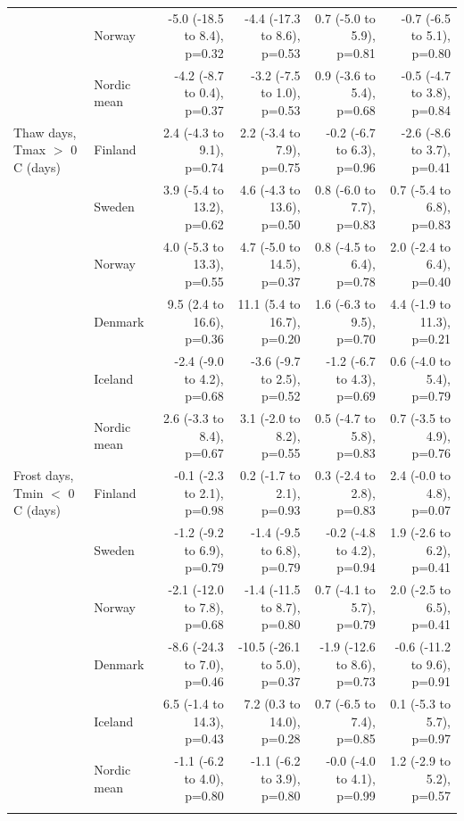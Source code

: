 \begin{tabular}{llrrrr}
 & Norway & -5.0 (-18.5 to 8.4), p=0.32 & -4.4 (-17.3 to 8.6), p=0.53 & 0.7 (-5.0 to 5.9), p=0.81 & -0.7 (-6.5 to 5.1), p=0.80 \\
 & Nordic mean & -4.2 (-8.7 to 0.4), p=0.37 & -3.2 (-7.5 to 1.0), p=0.53 & 0.9 (-3.6 to 5.4), p=0.68 & -0.5 (-4.7 to 3.8), p=0.84 \\
\addlinespace
Thaw days, Tmax $>$ 0 \textdegree{}C (days) & Finland & 2.4 (-4.3 to 9.1), p=0.74 & 2.2 (-3.4 to 7.9), p=0.75 & -0.2 (-6.7 to 6.3), p=0.96 & -2.6 (-8.6 to 3.7), p=0.41 \\
 & Sweden & 3.9 (-5.4 to 13.2), p=0.62 & 4.6 (-4.3 to 13.6), p=0.50 & 0.8 (-6.0 to 7.7), p=0.83 & 0.7 (-5.4 to 6.8), p=0.83 \\
 & Norway & 4.0 (-5.3 to 13.3), p=0.55 & 4.7 (-5.0 to 14.5), p=0.37 & 0.8 (-4.5 to 6.4), p=0.78 & 2.0 (-2.4 to 6.4), p=0.40 \\
 & Denmark & 9.5 (2.4 to 16.6), p=0.36 & 11.1 (5.4 to 16.7), p=0.20 & 1.6 (-6.3 to 9.5), p=0.70 & 4.4 (-1.9 to 11.3), p=0.21 \\
 & Iceland & -2.4 (-9.0 to 4.2), p=0.68 & -3.6 (-9.7 to 2.5), p=0.52 & -1.2 (-6.7 to 4.3), p=0.69 & 0.6 (-4.0 to 5.4), p=0.79 \\
 & Nordic mean & 2.6 (-3.3 to 8.4), p=0.67 & 3.1 (-2.0 to 8.2), p=0.55 & 0.5 (-4.7 to 5.8), p=0.83 & 0.7 (-3.5 to 4.9), p=0.76 \\
\addlinespace
Frost days, Tmin $<$ 0 \textdegree{}C (days) & Finland & -0.1 (-2.3 to 2.1), p=0.98 & 0.2 (-1.7 to 2.1), p=0.93 & 0.3 (-2.4 to 2.8), p=0.83 & 2.4 (-0.0 to 4.8), p=0.07 \\
 & Sweden & -1.2 (-9.2 to 6.9), p=0.79 & -1.4 (-9.5 to 6.8), p=0.79 & -0.2 (-4.8 to 4.2), p=0.94 & 1.9 (-2.6 to 6.2), p=0.41 \\
 & Norway & -2.1 (-12.0 to 7.8), p=0.68 & -1.4 (-11.5 to 8.7), p=0.80 & 0.7 (-4.1 to 5.7), p=0.79 & 2.0 (-2.5 to 6.5), p=0.41 \\
 & Denmark & -8.6 (-24.3 to 7.0), p=0.46 & -10.5 (-26.1 to 5.0), p=0.37 & -1.9 (-12.6 to 8.6), p=0.73 & -0.6 (-11.2 to 9.6), p=0.91 \\
 & Iceland & 6.5 (-1.4 to 14.3), p=0.43 & 7.2 (0.3 to 14.0), p=0.28 & 0.7 (-6.5 to 7.4), p=0.85 & 0.1 (-5.3 to 5.7), p=0.97 \\
 & Nordic mean & -1.1 (-6.2 to 4.0), p=0.80 & -1.1 (-6.2 to 3.9), p=0.80 & -0.0 (-4.0 to 4.1), p=0.99 & 1.2 (-2.9 to 5.2), p=0.57 \\
\addlinespace
\bottomrule
\end{tabular}